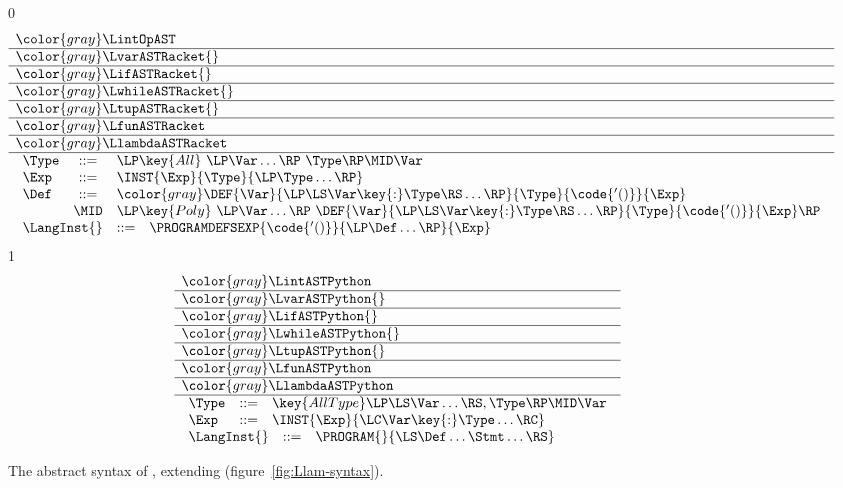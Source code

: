 \documentclass[7x10]{TimesAPriori_MIT}%
\newcommand{\gray}[1]{{\color{gray} #1}}
\def\racketEd{0}
\def\pythonEd{1}
\def\edition{0}
\numberwithin{theorem}{chapter}
\numberwithin{definition}{chapter}
\numberwithin{equation}{chapter}
\begin{document}
\newcommand{\LinstASTRacket}{
\begin{array}{lcl}
  \Type &::=& \LP\key{All}~\LP\Var\ldots\RP~ \Type\RP \MID \Var \\
  \Exp &::=& \INST{\Exp}{\Type}{\LP\Type\ldots\RP} \\
  \Def &::=& \gray{ \DEF{\Var}{\LP\LS\Var \key{:} \Type\RS \ldots\RP}{\Type}{\code{'()}}{\Exp} } \\
   &\MID& \LP\key{Poly}~\LP\Var\ldots\RP~ \DEF{\Var}{\LP\LS\Var \key{:} \Type\RS \ldots\RP}{\Type}{\code{'()}}{\Exp}\RP 
\end{array}
}  

\newcommand{\LinstASTPython}{
\begin{array}{lcl}
  \Type &::=& \key{AllType}\LP\LS\Var\ldots\RS, \Type\RP \MID \Var \\
  \Exp &::=& \INST{\Exp}{\LC\Var\key{:}\Type\ldots\RC} 
\end{array}
}

\begin{figure}[tp]
\centering
\begin{tcolorbox}[colback=white]
\small
\if\edition\racketEd
\[
\begin{array}{l}
  \gray{\LintOpAST} \\ \hline
  \gray{\LvarASTRacket{}} \\ \hline
  \gray{\LifASTRacket{}} \\ \hline
  \gray{\LwhileASTRacket{}} \\ \hline
  \gray{\LtupASTRacket{}} \\ \hline
  \gray{\LfunASTRacket} \\ \hline
  \gray{\LlambdaASTRacket} \\ \hline
  \LinstASTRacket \\
\begin{array}{lcl}
  \LangInst{} &::=& \PROGRAMDEFSEXP{\code{'()}}{\LP\Def\ldots\RP}{\Exp}
\end{array}
\end{array}
\]
\fi
\if\edition\pythonEd
\[
\begin{array}{l}
  \gray{\LintASTPython} \\ \hline
  \gray{\LvarASTPython{}} \\ \hline
  \gray{\LifASTPython{}} \\ \hline
  \gray{\LwhileASTPython{}} \\ \hline
  \gray{\LtupASTPython{}} \\ \hline
  \gray{\LfunASTPython} \\ \hline
  \gray{\LlambdaASTPython} \\ \hline
  \LinstASTPython \\
  \begin{array}{lcl}
  \LangInst{} &::=& \PROGRAM{}{\LS \Def \ldots \Stmt \ldots \RS}
  \end{array}
\end{array}
\]
\fi
\end{tcolorbox}

\caption{The abstract syntax of \LangInst{}, extending \LangLam{}
    (figure~\ref{fig:Llam-syntax}).}
\label{fig:Lpoly-prime-syntax}
\end{figure}
\end{document}
